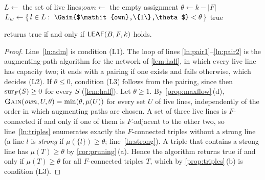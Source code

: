 \begin{algorithm}[t]
\DontPrintSemicolon
{}
$L\gets$ the set of live lines;\quad $\mathit{own}\gets$ the empty assignment\;
$\theta\gets k-|F|$\;
$L_w\gets\{\,l\in L:\ \Gain{$\mathit{own},\{l\},\theta$}<\theta\,\}$ 
\Return true\;
\BlankLine
{}
\caption{The test $\LEAF(B,F,k)$ by integer max-flow.}
\label{alg:leaf}
\end{algorithm}

\begin{proposition}\label{prop:leaf-correct}
 returns true if and only if $\LEAF(B,F,k)$ holds.
\end{proposition}

\begin{proof}
Line~\ref{ln:adm} is condition (L1). The loop of lines \ref{ln:pair1}--\ref{ln:pair2} is the
augmenting-path algorithm for the network of \cref{lem:hall}, in which every live line has capacity two; it
ends with a pairing if one exists and fails otherwise, which decides (L2). If $\theta\le 0$, condition (L3)
follows from the pairing, since then $\operatorname{sur}_F(S)\ge 0$ for every $S$ (\cref{lem:hall}). Let $\theta\ge1$. By
\cref{prop:maxflow}\,(d), $\textsc{Gain}(\mathit{own},U,\theta)=\min(\theta,\mu(U))$ for every set $U$ of
live lines, independently of the order in which augmenting paths are chosen. A set of three live lines is
$F$-connected if and only if one of them is $F$-adjacent to the other two, so
line~\ref{ln:triples} enumerates exactly the $F$-connected triples without a strong line (a line $l$ is
\emph{strong} if $\mu(\{l\})\ge\theta$; line~\ref{ln:strong}). A triple that contains a strong line has
$\mu(T)\ge\theta$ by \cref{cor:pruning}\,(a). Hence the algorithm returns true if and only if
$\mu(T)\ge\theta$ for all $F$-connected triples $T$, which by \cref{prop:triples}\,(b) is condition (L3).
\end{proof}


